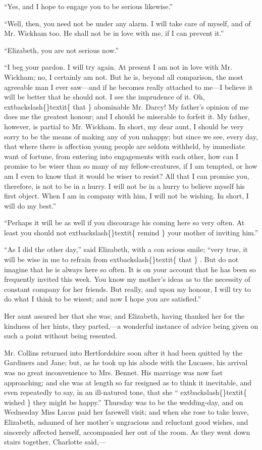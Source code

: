 \documentclass[10pt]{book}
\begin{document}
   “Yes, and I hope to engage you to be serious likewise.”
  

   “Well, then, you need not be under any alarm. I will take care of
myself, and of Mr. Wickham too. He shall not be in love with me, if I
can prevent it.”
  

   “Elizabeth, you are not serious now.”
  

   “I beg your pardon. I will try again. At present I am not in love with
Mr. Wickham; no, I certainly am not. But he is, beyond all comparison,
the most agreeable man I ever saw—and if he becomes really attached to
me—I believe it will be better that he should not. I see the imprudence
of it. Oh,
   	extbackslash\{\}textit\{
    that
   \}
   abominable Mr. Darcy! My father’s opinion of me does
me the greatest honour; and I should be miserable to forfeit it. My
father, however, is partial to Mr. Wickham. In short, my dear aunt, I
should be very sorry to be the means of making any of you unhappy; but
since we see, every day, that where there is affection young people are
seldom withheld, by immediate want of fortune, from entering into
engagements with each other, how can I promise to be wiser than so many
of my fellow-creatures, if I am tempted, or how am I even to know that
it would be wiser to resist? All that I can promise you, therefore, is
not to be in a hurry. I will not be in a hurry to believe myself his
first object. When I am in company with him, I will not be wishing. In
short, I will do my best.”
  

   “Perhaps it will be as well if you discourage his coming here so very
often. At least you should not
   	extbackslash\{\}textit\{
    remind
   \}
   your mother of inviting him.”
  

   “As I did the other day,” said Elizabeth, with a con
   scious smile; “very
true, it will be wise in me to refrain from
   	extbackslash\{\}textit\{
    that
   \}
   . But do not imagine
that he is always here so often. It is on your account that he has been
so frequently invited this week. You know my mother’s ideas as to the
necessity of constant company for her friends. But really, and upon my
honour, I will try to do what I think to be wisest; and now I hope you
are satisfied.”
  

   Her aunt assured her that she was; and Elizabeth, having thanked her for
the kindness of her hints, they parted,—a wonderful instance of advice
being given on such a point without being resented.
  

   Mr. Collins returned into Hertfordshire soon after it had been quitted
by the Gardiners and Jane; but, as he took up his abode with the
Lucases, his arrival was no great inconvenience to Mrs. Bennet. His
marriage was now fast approaching; and she was at length so far resigned
as to think it inevitable, and even repeatedly to say, in an ill-natured
tone, that she “
   	extbackslash\{\}textit\{
    wished
   \}
   they might be happy.” Thursday was to be the
wedding-day, and on Wednesday Miss Lucas paid her farewell visit; and
when she rose to take leave, Elizabeth, ashamed of her mother’s
ungracious and reluctant good wishes, and sincerely affected herself,
accompanied her out of the room. As they went down stairs together,
Charlotte said,—
  
\end{document}
